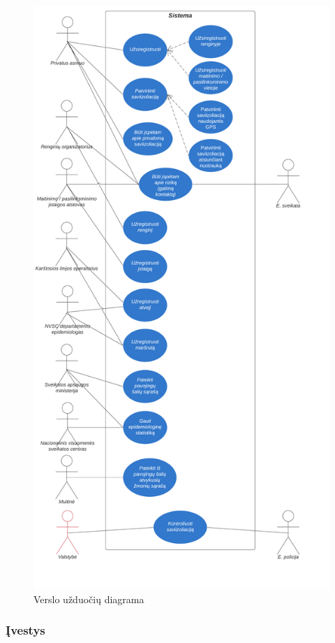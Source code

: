 \documentclass{VUMIFPSkursinis}
\begin{document}
\begin{figure}[H]
	\centering
	\includegraphics[scale=0.6]{img/use_case_diagram_business.png}
	\caption{Verslo užduočių diagrama}
	\label{img:use_case_diagram}
\end{figure}
\newpage
\subsubsection{Įvestys}
\end{document}
